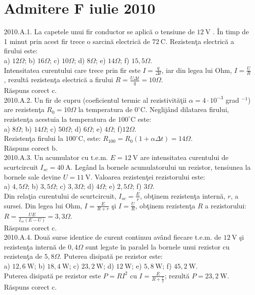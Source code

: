 \section{Admitere F iulie 2010}

2010.A.1. La capetele unui fir conductor se aplică o tensiune de $12 \mathrm{~V}$ . În timp de 1 minut prin acest fir trece o sarcină electrică de $72 \mathrm{~C}$. Rezistenţa electrică a firului este:\\ a) $12 \Omega$; b) $16 \Omega$; c) $10 \Omega$; d) $8 \Omega$; e) $14 \Omega$; f) $15,5 \Omega$.\\ Intensitatea curentului care trece prin fir este $I=\frac{q}{\Delta t}$, iar din legea lui Ohm, $I=\frac{U}{R}$, rezultă rezistenţa electrică a firului $R=\frac{U \Delta t}{q}=10 \Omega$.\\ Răspuns corect c.\\

2010.A.2. Un fir de cupru (coeficientul termic al rezistivităţii $\alpha=4 \cdot 10^{-3}$ grad $^{-1}$) are rezistenţa $R_{0}=10 \Omega$ la temperatura de $0^{\circ} \mathrm{C}$. Neglijând dilatarea firului, rezistenţa acestuia la temperatura de $100^{\circ} \mathrm{C}$ este:\\ a) $8 \Omega$; b) $14 \Omega$; c) $50 \Omega$; d) $6 \Omega$; e) $4 \Omega$; f)$12 \Omega$.\\ Rezistenţa firului la $100^{\circ} \mathrm{C}$, este: $R_{100}=R_{0}(1+\alpha \Delta t)=14 \Omega$.\\ Răspuns corect b.\\

2010.A.3. Un acumulator cu t.e.m. $E=12 \mathrm{~V}$ are intensitatea curentului de scurtcircuit $I_{s c}=40 \mathrm{~A}$. Legând la bornele acumulatorului un rezistor, tensiunea la bornele sale devine $U=11 \mathrm{~V}$. Valoarea rezistenţei rezistorului este:\\ a) $4,5 \Omega$; b) $3,5 \Omega$; c) $3,3 \Omega$; d) $4 \Omega$; e) $2,5 \Omega$; f) $3 \Omega$.\\ Din relaţia curentului de scurtcircuit, $I_{s c}=\frac{E}{r}$, obţinem rezistenţa internă, $r$, a sursei. Din legea lui Ohm, $I=\frac{E}{R+r}$ şi $I=\frac{U}{R}$, obţinem rezistenţa $R$ a rezistorului: $R=\frac{U E}{I_{s c}(E-U)}=3,3 \Omega$.\\ Răspuns corect c.\\

2010.A.4. Două surse identice de curent continuu având fiecare t.e.m. de $12 \mathrm{~V}$ şi rezistenţa internă de $0,4 \Omega$ sunt legate în paralel la bornele unui rezistor cu rezistenţa de $5,8 \Omega$. Puterea disipată pe rezistor este:\\ a) $12,6 \mathrm{~W}$; b) $18,4 \mathrm{~W}$; c) $23,2 \mathrm{~W}$; d) $12 \mathrm{~W}$; e) $5,8 \mathrm{~W}$; f) $45,2 \mathrm{~W}$.\\ Puterea disipată pe rezistor este $P=R I^{2}$ cu $I=\frac{E}{R+\frac{r}{2}}$; rezultă $P=23,2 \mathrm{~W}$.\\ Răspuns corect c.\\

